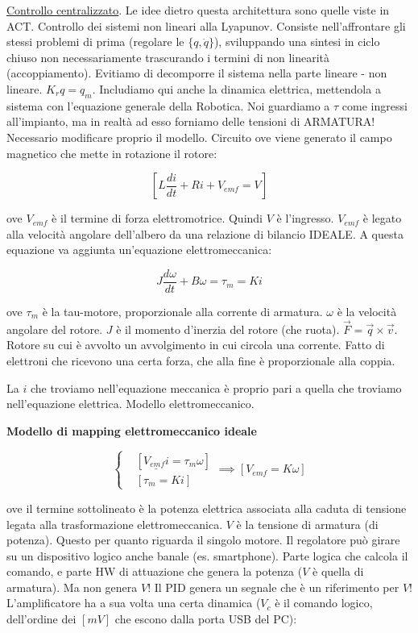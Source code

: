 \underline{Controllo centralizzato}. Le idee dietro questa architettura sono quelle viste in ACT. Controllo dei sistemi non lineari alla Lyapunov. Consiste nell'affrontare gli stessi problemi di prima (regolare le $\{q,\dot{q}\}$), sviluppando una sintesi in ciclo chiuso non necessariamente trascurando i termini di non linearità (accoppiamento). Evitiamo di decomporre il sistema nella parte lineare - non lineare. $K_rq=q_m$. Includiamo qui anche la dinamica elettrica, mettendola a sistema con l'equazione generale della Robotica. Noi guardiamo a $\tau$ come ingressi all'impianto, ma in realtà ad esso forniamo delle tensioni di ARMATURA! Necessario modificare proprio il modello. Circuito ove viene generato il campo magnetico che mette in rotazione il rotore:

\[
	[L\frac{di}{dt} + Ri + V_{emf} = V]
\]

ove $V_{emf}$ è il termine di forza elettromotrice. Quindi $V$ è l'ingresso. $V_{emf}$ è legato alla velocità angolare dell'albero da una relazione di bilancio IDEALE. A questa equazione va aggiunta un'equazione elettromeccanica:

\[
	J\frac{d\omega}{dt} + B\omega = \tau_m = Ki
\]

ove $\tau_m$ è la tau-motore, proporzionale alla corrente di armatura. $\omega$ è la velocità angolare del rotore. $J$ è il momento d'inerzia del rotore (che ruota). $\vec{F}=\vec{q}\times \vec{v}$. Rotore su cui è avvolto un avvolgimento in cui circola una corrente. Fatto di elettroni che ricevono una certa forza, che alla fine è proporzionale alla coppia.

La $i$ che troviamo nell'equazione meccanica è proprio pari a quella che troviamo nell'equazione elettrica. Modello elettromeccanico.

\begin{defn}{\textbf{Modello di mapping elettromeccanico ideale}}

\[
	\left\{
	\begin{aligned}
	&[\underline{V_{emf}i} = \tau_m\omega]\\
	&[\tau_m=Ki]
	\end{aligned}
	\right.\implies [V_{emf}=K\omega]
\]

\end{defn}

ove il termine sottolineato è la potenza elettrica associata alla caduta di tensione legata alla trasformazione elettromeccanica. $V$ è la tensione di armatura (di potenza). Questo per quanto riguarda il singolo motore. Il regolatore può girare su un dispositivo logico anche banale (es. smartphone). Parte logica che calcola il comando, e parte HW di attuazione che genera la potenza ($V$ è quella di armatura). Ma non genera $V$! Il PID genera un segnale che è un riferimento per $V$! L'amplificatore ha a sua volta una certa dinamica ($V_c$ è il comando logico, dell'ordine dei $[mV]$ che escono dalla porta USB del PC):

